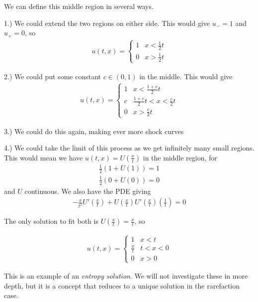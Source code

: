 \documentclass{article}
\begin{document}
	We can define this middle region in several ways.
	
	1.) We could extend the two regions on either side. This would give $u_- = 1$ and $u_+ = 0$, so 
	\begin{align*}
		u(t,x) = \begin{cases}
			1 & x < \frac{1}{2}t \\
			0 & x > \frac{1}{2} t
		\end{cases}
	\end{align*}
	
	2.) We could put some constant $c \in (0,1)$ in the middle. This would give
	\begin{align*}
		u(t,x) = \begin{cases}
			1 & x < \frac{1+c}{2}t \\
			c &  \frac{1+c}{2}t < x < \frac{c}{2} t \\
			0 & x > \frac{c}{2} t
		\end{cases}
	\end{align*}
	
	3.) We could do this again, making ever more shock curves

	4.) We could take the limit of this process as we get infinitely many small regions. This would mean we have $u(t,x) = U(\frac{x}{t})$ in the middle region, for 
	\begin{align*}
		\frac{1}{2}(1+U(1)) = 1 \\
		\frac{1}{2}(0 + U(0)) = 0
	\end{align*}
	and $U$ continuous. We also have the PDE giving 
	\begin{align*}
		-\frac{x}{t^2}U'(\frac{x}{t}) + U(\frac{x}{t})U'(\frac{x}{t})(\frac{1}{t}) = 0
	\end{align*} 
	
	The only solution to fit both is $U(\frac{x}{t}) = \frac{x}{t}$, so 	
	
	\begin{align*}
		u(t,x) = \begin{cases}
			1 & x < t \\
			\frac{x}{t} &  t < x < 0 \\
			0 & x > 0
		\end{cases}
	\end{align*}
	
	This is an example of an \textit{entropy solution}. We will not investigate these in more depth, but it is a concept that reduces to a unique solution in the rarefaction case. 
	
	
	
\end{document}

